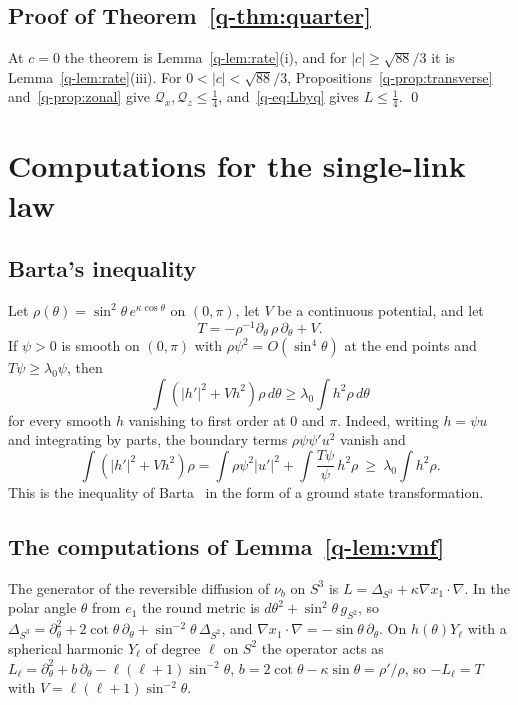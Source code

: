 \documentclass[11pt]{amsart}
\theoremstyle{definition}
\theoremstyle{remark}
\numberwithin{equation}{section}
\begin{document}
\subsection{Proof of Theorem~\ref{q-thm:quarter}}

At $c=0$ the theorem is Lemma~\ref{q-lem:rate}(i), and for $|c|\ge\sqrt{88}/3$
it is Lemma~\ref{q-lem:rate}(iii). For $0<|c|<\sqrt{88}/3$,
Propositions~\ref{q-prop:transverse} and~\ref{q-prop:zonal} give $\mathcal Q_x,
\mathcal Q_z\le\frac14$, and~\eqref{q-eq:Lbyq} gives $L\le\frac14$. \qed


\section{Computations for the single-link law}\label{app:vmfcomp}

\subsection{Barta's inequality}

Let $\rho(\theta)=\sin^2\theta\,e^{\kappa\cos\theta}$ on $(0,\pi)$, let $V$
be a continuous potential, and let
\[
T=-\rho^{-1}\partial_\theta\,\rho\,\partial_\theta+V .
\] If $\psi>0$ is smooth on $(0,\pi)$ with
$\rho\psi^2=O(\sin^4\theta)$ at the end points and $T\psi\ge\lambda_0\psi$,
then
\[
\int(|h'|^2+Vh^2)\rho\,d\theta\ge\lambda_0\int h^2\rho\,d\theta
\]
for every smooth $h$ vanishing to first order at $0$ and $\pi$. Indeed, writing
$h=\psi u$ and integrating by parts, the boundary terms $\rho\psi\psi'u^2$
vanish and
\[
\int(|h'|^2+Vh^2)\rho=\int\rho\psi^2|u'|^2+\int\frac{T\psi}\psi\,h^2\rho
\ \ge\ \lambda_0\int h^2\rho .
\]
This is the inequality of Barta~\cite{Bar37} in the form of a ground state
transformation.

\subsection{The computations of Lemma~\ref{q-lem:vmf}}

The generator of the reversible diffusion of $\nu_b$ on $S^3$ is
$L=\Delta_{S^3}+\kappa\nabla x_1\cdot\nabla$. In the polar angle $\theta$
from $e_1$ the round metric is $d\theta^2+\sin^2\theta\,g_{S^2}$, so
$\Delta_{S^3}=\partial_\theta^2+2\cot\theta\,\partial_\theta+\sin^{-2}\theta\,
\Delta_{S^2}$, and $\nabla x_1\cdot\nabla=-\sin\theta\,\partial_\theta$. On
$h(\theta)Y_\ell$ with a spherical harmonic $Y_\ell$ of degree $\ell$ on $S^2$
the operator acts as $L_\ell=\partial_\theta^2+b\,\partial_\theta-\ell(\ell+1)
\sin^{-2}\theta$, $b=2\cot\theta-\kappa\sin\theta=\rho'/\rho$, so
$-L_\ell=T$ with $V=\ell(\ell+1)\sin^{-2}\theta$.
\end{document}
